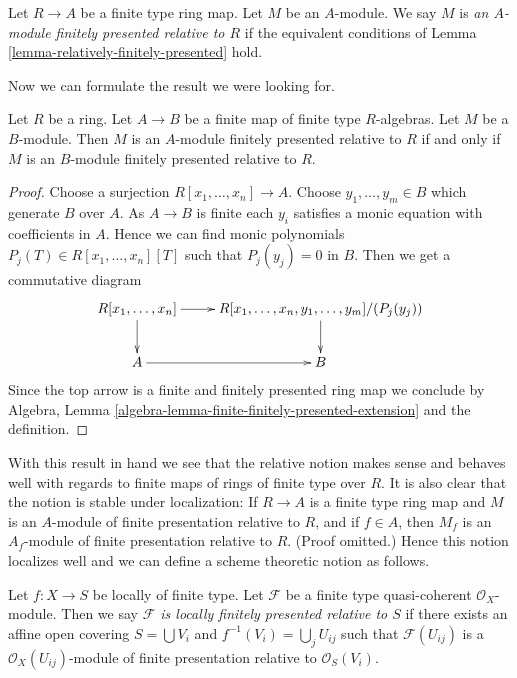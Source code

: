 \begin{definition}
\label{definition-relatively-finitely-presented}
Let $R \to A$ be a finite type ring map. Let $M$ be an $A$-module.
We say $M$ is {\it an $A$-module finitely presented relative to $R$}
if the equivalent conditions of
Lemma \ref{lemma-relatively-finitely-presented}
hold.
\end{definition}

\noindent
Now we can formulate the result we were looking for.

\begin{lemma}
\label{lemma-finite-extension}
Let $R$ be a ring. Let $A \to B$ be a finite map of finite type $R$-algebras.
Let $M$ be a $B$-module. Then
$M$ is an $A$-module finitely presented relative to $R$
if and only if
$M$ is an $B$-module finitely presented relative to $R$.
\end{lemma}

\begin{proof}
Choose a surjection $R[x_1, \ldots, x_n] \to A$.
Choose $y_1, \ldots, y_m \in B$ which generate $B$ over $A$.
As $A \to B$ is finite each $y_i$ satisfies a monic equation with
coefficients in $A$. Hence we can find monic polynomials
$P_j(T) \in R[x_1, \ldots, x_n][T]$ such that $P_j(y_j) = 0$ in $B$.
Then we get a commutative diagram
$$
\xymatrix{
R[x_1, \ldots, x_n] \ar[d] \ar[r] &
R[x_1, \ldots, x_n, y_1, \ldots, y_m]/(P_j(y_j)) \ar[d] \\
A \ar[r] & B
}
$$
Since the top arrow is a finite and finitely presented ring map
we conclude by
Algebra, Lemma \ref{algebra-lemma-finite-finitely-presented-extension}
and the definition.
\end{proof}

\noindent
With this result in hand we see that the relative notion makes sense
and behaves well with regards to finite maps of rings of finite type
over $R$. It is also clear that the notion is stable under localization:
If $R \to A$ is a finite type ring map and $M$ is an $A$-module
of finite presentation relative to $R$, and if $f \in A$, then
$M_f$ is an $A_f$-module of finite presentation relative to $R$.
(Proof omitted.) Hence this notion localizes well and we can define
a scheme theoretic notion as follows.

\begin{definition}
\label{definition-relatively-finitely-presented-sheaf}
Let $f : X \to S$ be locally of finite type.
Let $\mathcal{F}$ be a finite type quasi-coherent $\mathcal{O}_X$-module.
Then we say {\it $\mathcal{F}$ is locally finitely presented relative to $S$}
if there exists an affine open covering $S = \bigcup V_i$ and
$f^{-1}(V_i) = \bigcup_j U_{ij}$ such that $\mathcal{F}(U_{ij})$
is a $\mathcal{O}_X(U_{ij})$-module of finite presentation relative
to $\mathcal{O}_S(V_i)$.
\end{definition}

